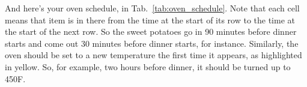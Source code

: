 \documentclass[12pt]{article}
\begin{document}
	And here's your oven schedule, in Tab.~\ref{tab:oven_schedule}. Note that each cell means that item is in there from the time at the start of its row to the time at the start of the next row. So the sweet potatoes go in 90 minutes before dinner starts and come out 30 minutes before dinner starts, for instance. Similarly, the oven should be set to a new temperature the first time it appears, as highlighted in yellow. So, for example, two hours before dinner, it should be turned up to 450F.
	
\end{document}
